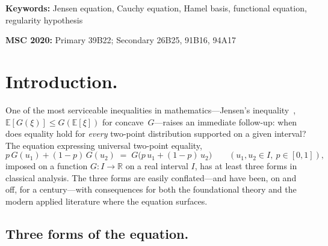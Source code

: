 \documentclass{article}
\theoremstyle{plain}
\theoremstyle{definition}
\newcommand{\R}{\mathbb{R}}
\newcommand{\E}{\mathbb{E}}
\begin{document}
\vspace{8px}

\noindent\textbf{Keywords:} Jensen equation, Cauchy equation, Hamel basis,
functional equation, regularity hypothesis

\vspace{4px}

\noindent\textbf{MSC 2020:} Primary 39B22; Secondary 26B25, 91B16, 94A17

\vspace{8px}

\section{Introduction.}
\label{sec:intro}

One of the most serviceable inequalities in mathematics---Jensen's
inequality~\cite{Jensen1906}, $\E[G(\xi)]\le G(\E[\xi])$ for concave~$G$---raises an
immediate follow-up: when does equality hold for \emph{every} two-point
distribution supported on a given interval? The equation expressing
universal two-point equality,
\begin{equation}
p\,G(u_1)+(1-p)\,G(u_2) \;=\; G\bigl(p\,u_1+(1-p)\,u_2\bigr)
\qquad (u_1,u_2\in I,\ p\in[0,1]),
\tag{$\star$}\label{eq:star}
\end{equation}
imposed on a function $G\colon I\to\R$ on a real interval $I$, has
at least three forms in classical analysis. The three forms are easily
conflated---and have been, on and off, for a century---with consequences
for both the foundational theory and the modern applied literature where
the equation surfaces.

\subsection{Three forms of the equation.}
\end{document}
